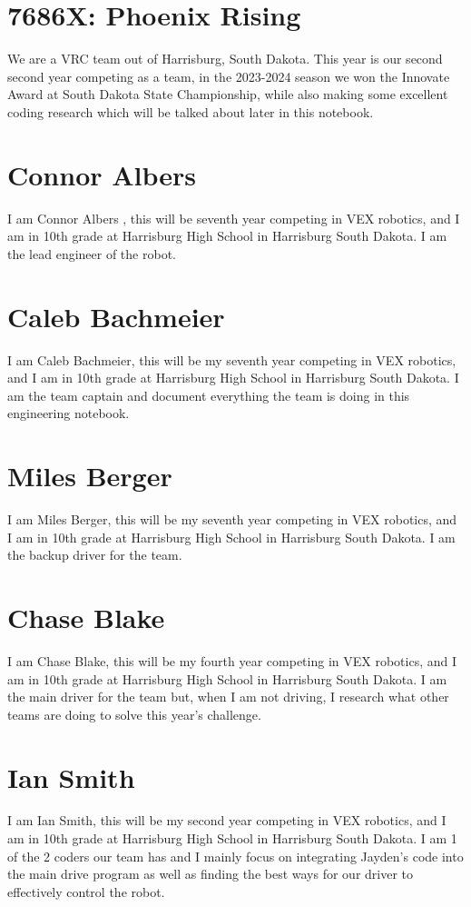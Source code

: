     \section*{7686X: Phoenix Rising}
    We are a VRC team out of Harrisburg, South Dakota. This year is our second second year competing as a team, in the 2023-2024 season we won the Innovate Award at South Dakota State Championship, while also making some excellent coding research which will be talked about later in this notebook.
   \section*{Connor Albers }
I am Connor Albers , this will be seventh year competing in VEX robotics, and I am in 10th grade at Harrisburg High School in Harrisburg South Dakota. I am the lead engineer of the robot.
\label{connor}
   \section*{Caleb Bachmeier}
I am Caleb Bachmeier, this will be my seventh year competing in VEX robotics,  and I am in 10th grade at Harrisburg High School in Harrisburg South Dakota. I am the team captain and document everything the team is doing in this engineering notebook. 
\label{Caleb}
   \section*{Miles Berger}
I am Miles Berger, this will be my seventh year competing in VEX robotics, and I am in 10th grade at Harrisburg High School in Harrisburg South Dakota. I am the backup driver for the team. 
\label{Miles}
   \section*{Chase Blake}
I am Chase Blake, this will be my fourth year competing in VEX robotics, and I am in 10th grade at Harrisburg High School in Harrisburg South Dakota. I am the main driver for the team but, when I am not driving, I research what other teams are doing to solve this year's challenge. 
\label{Chase}
   \section*{Ian Smith}
I am Ian Smith, this will be my second year competing in VEX robotics, and I am in 10th grade at Harrisburg High School in Harrisburg South Dakota. I am 1 of the 2 coders our team has and I mainly focus on integrating Jayden's code into the main drive program as well as finding the best ways for our driver to effectively control the robot. 
\label{Ian}
